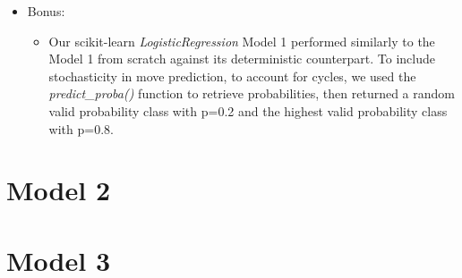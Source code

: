 \documentclass[11pt]{article}
\begin{document}
\begin{itemize}
    \item Bonus:
    \begin{itemize}
        \item Our scikit-learn \emph{LogisticRegression} Model 1 performed similarly to the Model 1 from scratch against its deterministic counterpart. To include stochasticity in move prediction, to account for cycles, we used the \emph{predict\_proba()} function to retrieve probabilities, then returned a random valid probability class with p=0.2 and the highest valid probability class with p=0.8.
    \end{itemize}
\end{itemize}

\section{Model 2}






\section{Model 3}





\end{document}
